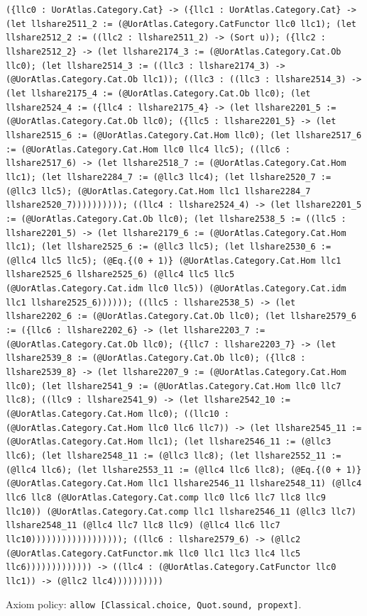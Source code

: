 \documentclass[11pt]{article}
\begin{document}
\noindent\texttt{(\{llc0 : UorAtlas.Category.Cat\} -> (\{llc1 : UorAtlas.Category.Cat\} -> (let llshare2511\_2 := (@UorAtlas.Category.CatFunctor llc0 llc1); (let llshare2512\_2 := ((llc2 : llshare2511\_2) -> (Sort u)); (\{llc2 : llshare2512\_2\} -> (let llshare2174\_3 := (@UorAtlas.Category.Cat.Ob llc0); (let llshare2514\_3 := ((llc3 : llshare2174\_3) -> (@UorAtlas.Category.Cat.Ob llc1)); ((llc3 : ((llc3 : llshare2514\_3) -> (let llshare2175\_4 := (@UorAtlas.Category.Cat.Ob llc0); (let llshare2524\_4 := (\{llc4 : llshare2175\_4\} -> (let llshare2201\_5 := (@UorAtlas.Category.Cat.Ob llc0); (\{llc5 : llshare2201\_5\} -> (let llshare2515\_6 := (@UorAtlas.Category.Cat.Hom llc0); (let llshare2517\_6 := (@UorAtlas.Category.Cat.Hom llc0 llc4 llc5); ((llc6 : llshare2517\_6) -> (let llshare2518\_7 := (@UorAtlas.Category.Cat.Hom llc1); (let llshare2284\_7 := (@llc3 llc4); (let llshare2520\_7 := (@llc3 llc5); (@UorAtlas.Category.Cat.Hom llc1 llshare2284\_7 llshare2520\_7)))))))))); ((llc4 : llshare2524\_4) -> (let llshare2201\_5 := (@UorAtlas.Category.Cat.Ob llc0); (let llshare2538\_5 := ((llc5 : llshare2201\_5) -> (let llshare2179\_6 := (@UorAtlas.Category.Cat.Hom llc1); (let llshare2525\_6 := (@llc3 llc5); (let llshare2530\_6 := (@llc4 llc5 llc5); (@Eq.\{(0 + 1)\} (@UorAtlas.Category.Cat.Hom llc1 llshare2525\_6 llshare2525\_6) (@llc4 llc5 llc5 (@UorAtlas.Category.Cat.idm llc0 llc5)) (@UorAtlas.Category.Cat.idm llc1 llshare2525\_6)))))); ((llc5 : llshare2538\_5) -> (let llshare2202\_6 := (@UorAtlas.Category.Cat.Ob llc0); (let llshare2579\_6 := (\{llc6 : llshare2202\_6\} -> (let llshare2203\_7 := (@UorAtlas.Category.Cat.Ob llc0); (\{llc7 : llshare2203\_7\} -> (let llshare2539\_8 := (@UorAtlas.Category.Cat.Ob llc0); (\{llc8 : llshare2539\_8\} -> (let llshare2207\_9 := (@UorAtlas.Category.Cat.Hom llc0); (let llshare2541\_9 := (@UorAtlas.Category.Cat.Hom llc0 llc7 llc8); ((llc9 : llshare2541\_9) -> (let llshare2542\_10 := (@UorAtlas.Category.Cat.Hom llc0); ((llc10 : (@UorAtlas.Category.Cat.Hom llc0 llc6 llc7)) -> (let llshare2545\_11 := (@UorAtlas.Category.Cat.Hom llc1); (let llshare2546\_11 := (@llc3 llc6); (let llshare2548\_11 := (@llc3 llc8); (let llshare2552\_11 := (@llc4 llc6); (let llshare2553\_11 := (@llc4 llc6 llc8); (@Eq.\{(0 + 1)\} (@UorAtlas.Category.Cat.Hom llc1 llshare2546\_11 llshare2548\_11) (@llc4 llc6 llc8 (@UorAtlas.Category.Cat.comp llc0 llc6 llc7 llc8 llc9 llc10)) (@UorAtlas.Category.Cat.comp llc1 llshare2546\_11 (@llc3 llc7) llshare2548\_11 (@llc4 llc7 llc8 llc9) (@llc4 llc6 llc7 llc10)))))))))))))))))); ((llc6 : llshare2579\_6) -> (@llc2 (@UorAtlas.Category.CatFunctor.mk llc0 llc1 llc3 llc4 llc5 llc6))))))))))))) -> ((llc4 : (@UorAtlas.Category.CatFunctor llc0 llc1)) -> (@llc2 llc4))))))))))}\par
\noindent Axiom policy: \texttt{allow [Classical.choice, Quot.sound, propext]}.\par
\end{document}
